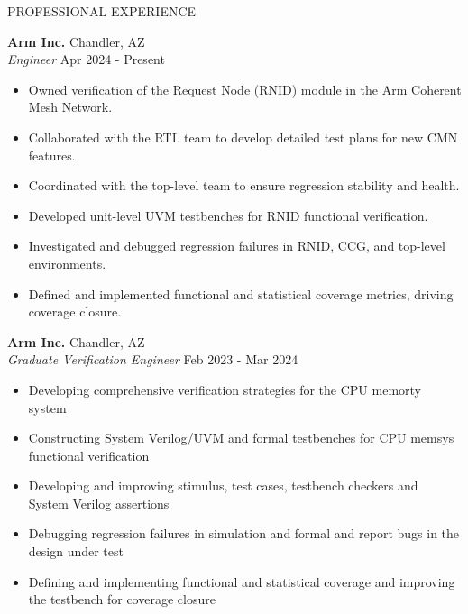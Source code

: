 \documentclass{resume} %
\newcommand{\myitemsep}{\itemsep -0.6em}
\begin{document}
  \begin{rSection}{PROFESSIONAL EXPERIENCE}

    \textbf{Arm Inc.}                           \hfill Chandler, AZ         \\
    \emph{Engineer}                             \hfill Apr 2024 - Present   \\
    \LineShrinkBeforeItem
    \begin{itemize} [leftmargin=1em]
      \myitemsep
      \item Owned verification of the Request Node (RNID) module in the Arm Coherent Mesh Network.
      \item Collaborated with the RTL team to develop detailed test plans for new CMN features.
      \item Coordinated with the top-level team to ensure regression stability and health.
      \item Developed unit-level UVM testbenches for RNID functional verification.
      \item Investigated and debugged regression failures in RNID, CCG, and top-level environments.
      \item Defined and implemented functional and statistical coverage metrics, driving coverage closure.
    \end{itemize}

    \textbf{Arm Inc.}                           \hfill Chandler, AZ         \\
    \emph{Graduate Verification Engineer}       \hfill Feb 2023 - Mar 2024  \\
    \LineShrinkBeforeItem
    \begin{itemize} [leftmargin=1em]
      \myitemsep
      \item Developing comprehensive verification strategies for the CPU memorty system
      \item Constructing System Verilog/UVM and formal testbenches for CPU memsys functional verification
      \item Developing and improving stimulus, test cases, testbench checkers and System Verilog assertions
      \item Debugging regression failures in simulation and formal and report bugs in the design under test
      \item Defining and implementing functional and statistical coverage and improving the testbench for coverage closure
    \end{itemize}


\end{rSection}
\end{document}
